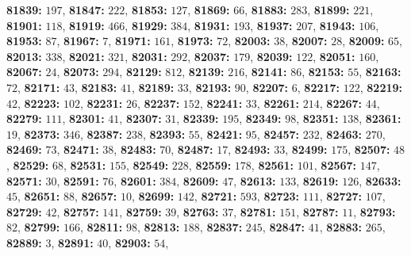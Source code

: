 \textsf{\bfseries 81839:} $197$, \textsf{\bfseries 81847:} $222$, \textsf{\bfseries 81853:} $127$, \textsf{\bfseries 81869:} $66$, \textsf{\bfseries 81883:} $283$, \textsf{\bfseries 81899:} $221$, \textsf{\bfseries 81901:} $118$, \textsf{\bfseries 81919:} $466$, \textsf{\bfseries 81929:} $384$, \textsf{\bfseries 81931:} $193$, \textsf{\bfseries 81937:} $207$, \textsf{\bfseries 81943:} $106$, \textsf{\bfseries 81953:} $87$, \textsf{\bfseries 81967:} $7$, \textsf{\bfseries 81971:} $161$, \textsf{\bfseries 81973:} $72$, \textsf{\bfseries 82003:} $38$, \textsf{\bfseries 82007:} $28$, \textsf{\bfseries 82009:} $65$, \textsf{\bfseries 82013:} $338$, \textsf{\bfseries 82021:} $321$, \textsf{\bfseries 82031:} $292$, \textsf{\bfseries 82037:} $179$, \textsf{\bfseries 82039:} $122$, \textsf{\bfseries 82051:} $160$, \textsf{\bfseries 82067:} $24$, \textsf{\bfseries 82073:} $294$, \textsf{\bfseries 82129:} $812$, \textsf{\bfseries 82139:} $216$, \textsf{\bfseries 82141:} $86$, \textsf{\bfseries 82153:} $55$, \textsf{\bfseries 82163:} $72$, \textsf{\bfseries 82171:} $43$, \textsf{\bfseries 82183:} $41$, \textsf{\bfseries 82189:} $33$, \textsf{\bfseries 82193:} $90$, \textsf{\bfseries 82207:} $6$, \textsf{\bfseries 82217:} $122$, \textsf{\bfseries 82219:} $42$, \textsf{\bfseries 82223:} $102$, \textsf{\bfseries 82231:} $26$, \textsf{\bfseries 82237:} $152$, \textsf{\bfseries 82241:} $33$, \textsf{\bfseries 82261:} $214$, \textsf{\bfseries 82267:} $44$, \textsf{\bfseries 82279:} $111$, \textsf{\bfseries 82301:} $41$, \textsf{\bfseries 82307:} $31$, \textsf{\bfseries 82339:} $195$, \textsf{\bfseries 82349:} $98$, \textsf{\bfseries 82351:} $138$, \textsf{\bfseries 82361:} $19$, \textsf{\bfseries 82373:} $346$, \textsf{\bfseries 82387:} $238$, \textsf{\bfseries 82393:} $55$, \textsf{\bfseries 82421:} $95$, \textsf{\bfseries 82457:} $232$, \textsf{\bfseries 82463:} $270$, \textsf{\bfseries 82469:} $73$, \textsf{\bfseries 82471:} $38$, \textsf{\bfseries 82483:} $70$, \textsf{\bfseries 82487:} $17$, \textsf{\bfseries 82493:} $33$, \textsf{\bfseries 82499:} $175$, \textsf{\bfseries 82507:} $48$, \textsf{\bfseries 82529:} $68$, \textsf{\bfseries 82531:} $155$, \textsf{\bfseries 82549:} $228$, \textsf{\bfseries 82559:} $178$, \textsf{\bfseries 82561:} $101$, \textsf{\bfseries 82567:} $147$, \textsf{\bfseries 82571:} $30$, \textsf{\bfseries 82591:} $76$, \textsf{\bfseries 82601:} $384$, \textsf{\bfseries 82609:} $47$, \textsf{\bfseries 82613:} $133$, \textsf{\bfseries 82619:} $126$, \textsf{\bfseries 82633:} $45$, \textsf{\bfseries 82651:} $88$, \textsf{\bfseries 82657:} $10$, \textsf{\bfseries 82699:} $142$, \textsf{\bfseries 82721:} $593$, \textsf{\bfseries 82723:} $111$, \textsf{\bfseries 82727:} $107$, \textsf{\bfseries 82729:} $42$, \textsf{\bfseries 82757:} $141$, \textsf{\bfseries 82759:} $39$, \textsf{\bfseries 82763:} $37$, \textsf{\bfseries 82781:} $151$, \textsf{\bfseries 82787:} $11$, \textsf{\bfseries 82793:} $82$, \textsf{\bfseries 82799:} $166$, \textsf{\bfseries 82811:} $98$, \textsf{\bfseries 82813:} $188$, \textsf{\bfseries 82837:} $245$, \textsf{\bfseries 82847:} $41$, \textsf{\bfseries 82883:} $265$, \textsf{\bfseries 82889:} $3$, \textsf{\bfseries 82891:} $40$, \textsf{\bfseries 82903:} $54$, 
